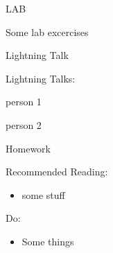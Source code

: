 \documentclass{beamer}
\begin{document}
\begin{frame}{LAB}

\vfill
{\large Some lab excercises}
\vfill

\end{frame}


\begin{frame}{Lightning Talk}

{\LARGE Lightning Talks:}

\vfill
{\large person 1}

\vfill
{\large person 2}

\end{frame}


\begin{frame}[fragile]{Homework}

Recommended Reading:
\begin{itemize}
  \item some stuff
\end{itemize}

Do:
\begin{itemize}
    \item Some things    
\end{itemize}

\end{frame}
\end{document}
